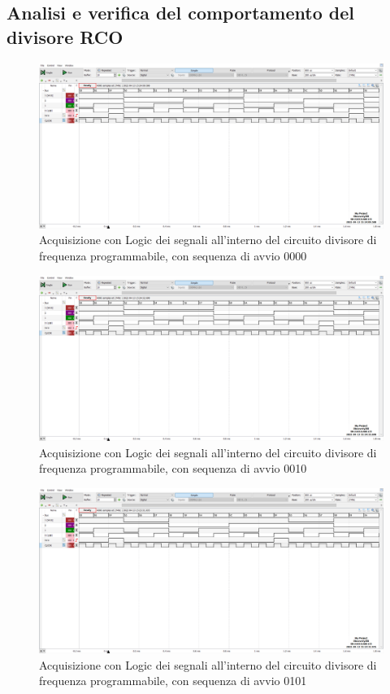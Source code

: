 \documentclass[10pt, a4paper, italian]{article}
\begin{document}
\subsection{Analisi e verifica del comportamento del divisore RCO}
\begin{figure}[htbp]
\centering
	\includegraphics[width=\textwidth]{5.f_0000}
	\caption{Acquisizione con Logic dei segnali all'interno del circuito divisore di frequenza programmabile, con sequenza di avvio 0000}
\end{figure}
\begin{figure}[htbp]
\centering
	\includegraphics[width=\textwidth]{5.f_0010}
	\caption{Acquisizione con Logic dei segnali all'interno del circuito divisore di frequenza programmabile, con sequenza di avvio 0010}
\end{figure}
\begin{figure}[htbp]
\centering
	\includegraphics[width=\textwidth]{5.f_0101}
	\caption{Acquisizione con Logic dei segnali all'interno del circuito divisore di frequenza programmabile, con sequenza di avvio 0101}
\end{figure}
\end{document}
